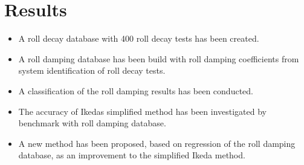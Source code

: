 \section{Results}
\label{se:results}

\begin{itemize}
  \item A roll decay database with 400 roll decay tests has been created.
  \item A roll damping database has been build with roll damping coefficients from system identification of roll decay tests.
  \item A classification of the roll damping results has been conducted.
  \item The accuracy of Ikedas simplified method has been investigated by benchmark with roll damping database.
  \item A new method has been proposed, based on regression of the roll damping database, as an improvement to the simplified Ikeda method.
\end{itemize}

